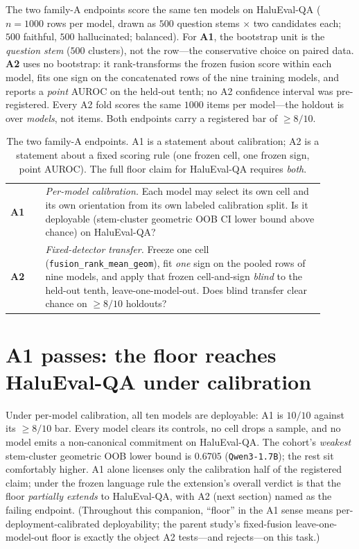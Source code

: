 \documentclass[11pt]{article}
\begin{document}
The two family-A endpoints score the same ten models on HaluEval-QA ($n{=}1000$ rows per model,
drawn as $500$ question stems $\times$ two candidates each; $500$ faithful, $500$ hallucinated;
balanced). For \textbf{A1},
the bootstrap unit is the \emph{question stem} ($500$ clusters), not the row---the conservative
choice on paired data. \textbf{A2} uses no bootstrap: it rank-transforms the frozen fusion score
within each model, fits one sign on the concatenated rows of the nine training models, and reports
a \emph{point} AUROC on the held-out tenth; no A2 confidence interval was pre-registered. Every A2
fold scores the same $1000$ items per model---the holdout is over \emph{models}, not items. Both
endpoints carry a registered bar of $\geq 8/10$.

\begin{table}[H]
\centering
\begin{tabular}{@{}p{0.10\linewidth}p{0.80\linewidth}@{}}
\toprule
\textbf{A1} & \emph{Per-model calibration.} Each model may select its own cell and its own
orientation from its own labeled calibration split. Is it deployable (stem-cluster geometric
OOB CI lower bound above chance) on HaluEval-QA? \\
\addlinespace
\textbf{A2} & \emph{Fixed-detector transfer.} Freeze one cell (\texttt{fusion\_rank\_mean\_geom}),
fit \emph{one} sign on the pooled rows of nine models, and apply that frozen cell-and-sign
\emph{blind} to the held-out tenth, leave-one-model-out. Does blind transfer clear chance on
$\geq 8/10$ holdouts? \\
\bottomrule
\end{tabular}
\caption{The two family-A endpoints. A1 is a statement about calibration; A2 is a statement
about a fixed scoring rule (one frozen cell, one frozen sign, point AUROC). The full floor claim
for HaluEval-QA requires \emph{both}.}
\end{table}

\section{A1 passes: the floor reaches HaluEval-QA under calibration}

Under per-model calibration, all ten models are deployable: A1 is $10/10$ against its $\geq 8/10$
bar. Every model clears its controls, no cell drops a sample, and no model emits a non-canonical
commitment on HaluEval-QA. The cohort's \emph{weakest} stem-cluster geometric OOB lower bound is
$0.6705$ (\texttt{Qwen3-1.7B}); the rest sit comfortably higher. A1 alone licenses only the
calibration half of the registered claim; under the frozen language rule the extension's overall
verdict is that the floor \emph{partially extends} to HaluEval-QA, with A2 (next section) named
as the failing endpoint. (Throughout this companion, ``floor'' in the A1 sense
means per-deployment-calibrated deployability; the parent study's fixed-fusion leave-one-model-out
floor is exactly the object A2 tests---and rejects---on this task.)
\end{document}
